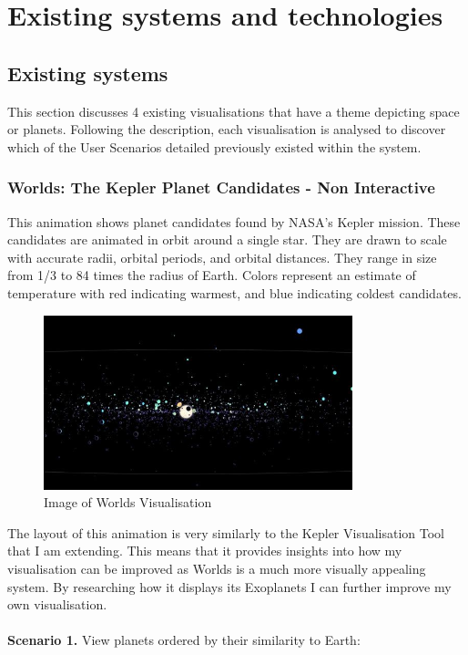 \chapter{Existing systems and technologies} 
\section{Existing systems}
This section discusses 4 existing visualisations that have a theme depicting
space or planets. Following the description, each visualisation is analysed to
discover which of the User Scenarios detailed previously existed within the
system.
\subsection{Worlds: The Kepler Planet Candidates - Non Interactive}
 This animation \cite{worlds} shows  planet candidates found by NASA's Kepler
mission. These candidates are animated in orbit around a single star. They are
drawn to scale with accurate radii, orbital periods, and orbital distances. They
range in size from 1/3 to 84 times the radius of Earth. Colors represent an
estimate of temperature with red indicating warmest, and blue indicating coldest
candidates. 
\begin{figure}[H]
  \centering
      \includegraphics[width=0.8\textwidth]{images/worlds.jpg}
  \caption{Image of Worlds Visualisation}
\end{figure}
The layout of this animation is very similarly to the Kepler Visualisation Tool
that I am extending. This means that it provides insights into how my
visualisation can be improved as Worlds is a much more visually appealing
system. By researching how it displays its Exoplanets I can further improve my
own visualisation.
 \\\\
{\bf Scenario 1.} View planets ordered by their similarity to Earth:\\
